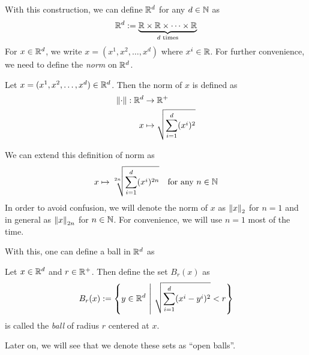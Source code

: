 \noindent With this construction, we can define \(\R^d\) for any \(d \in \mathbb N\) as
\begin{equation}
	\mathbb R^d := \underbrace{\mathbb R \times \mathbb R \times \cdots \times \mathbb R}_{d \text{ times}}
\end{equation}
For \(x \in \mathbb R^d\), we write \(x = (x^1, x^2, \ldots, x^d)\) where \(x^i \in \mathbb R\). For further convenience, we need to define the \emph{norm} on \(\R^d\).
\begin{definition}[norm]
	Let \(x = (x^1, x^2, \ldots, x^d) \in \mathbb R^d\). Then the norm of \(x\) is defined as
	\begin{equation}
		\begin{aligned}
			\norm{\cdot}: \mathbb R^d & \to \mathbb R^+                                \\
			x                  & \mapsto \sqrt{\sum_{i = 1}^{d} (x^i)^2}
		\end{aligned}
	\end{equation}
\end{definition}
We can extend this definition of norm as
\begin{equation}
	x \mapsto \sqrt[2 n]{\sum_{i = 1}^{d} (x^i)^{2 n}} \quad \text{for any}\ n \in \mathbb N
\end{equation}
In order to avoid confusion, we will denote the norm of \(x\) as \(\norm{x}_2\) for \(n = 1\) and in general as \(\norm{x}_{2 n}\) for \(n \in \mathbb N\). For convenience, we will use \(n = 1\) most of the time.

With this, one can define a ball in \(\R^d\) as
\begin{definition}[Ball in \(\R^d\)]
	Let \(x \in \mathbb R^d\) and \(r \in \mathbb R^+\). Then define the set \(B_r(x)\) as
	\begin{equation}
		B_r(x) := \qty{y \in \mathbb R^d \ \middle|\ \sqrt{\sum_{i = 1}^{d} (x^i - y^i)^2} < r}
	\end{equation}
	is called the \emph{ball} of radius \(r\) centered at \(x\).
\end{definition}
Later on, we will see that we denote these sets as ``open balls''.

